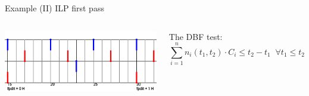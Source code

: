 \documentclass{beamer}
\begin{document}
    \begin{frame}{Example (II) ILP first pass}

    \begin{columns}[c]
        \begin{center}
            \includegraphics[width=\textwidth]{figs/CspaceExampleArrDead_restricted.png}
        \end{center}

        The DBF test:
        $$\sum_{i=1}^{n} n_i(t_1, t_2) \cdot C_i \leqslant t_2 - t_1 \; \; \forall t_1 \leq t_2$$


\end{columns}
\end{frame}
\end{document}
